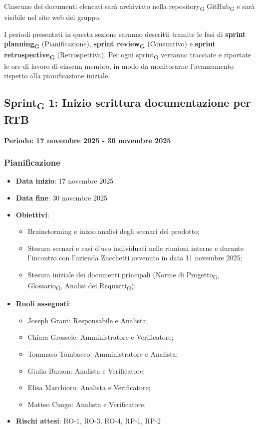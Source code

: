 \documentclass[11pt,a4paper]{article}
\newcommand{\gls}[1]{#1\textsubscript{G}}
\begin{document}
\noindent Ciascuno dei documenti elencati sarà archiviato nella \gls{repository} \gls{GitHub} e sarà visibile nel sito web del gruppo.

I periodi presentati in questa sezione saranno descritti tramite le fasi di \textbf{\gls{sprint planning}} (Pianificazione), \textbf{\gls{sprint review}} (Consuntivo) e \textbf{\gls{sprint retrospective}} (Retrospettiva). Per ogni \gls{sprint} verranno tracciate e riportate le ore di lavoro di ciascun membro, in modo da monitorarne l'avanzamento rispetto alla pianificazione iniziale.

\newpage
\subsection{\gls{Sprint} 1: Inizio scrittura documentazione per RTB}
{\textbf{Periodo: 17 novembre 2025 - 30 novembre 2025}\par}
\vspace{0.5em}

\subsubsection{Pianificazione}
\begin{itemize}
    \item \textbf{Data inizio}: 17 novembre 2025
    \item \textbf{Data fine}: 30 novembre 2025
    \item \textbf{Obiettivi}:
    \begin{itemize}
        \item Brainstorming e inizio analisi degli scenari del prodotto;
        \item Stesura scenari e casi d'uso individuati nelle riunioni interne e durante l'incontro con l'azienda Zucchetti avvenuto in data 11 novembre 2025;
        \item Stesura iniziale dei documenti principali (\gls{Norme di Progetto}, \gls{Glossario}, \gls{Analisi dei Requisiti});
    \end{itemize}
    \item \textbf{Ruoli assegnati}:
    \begin{itemize}
        \item Joseph Grant: Responsabile e Analista;
        \item Chiara Grossele: Amministratore e Verificatore;
        \item Tommaso Tombacco: Amministratore e Analista;
        \item Giulia Barzon: Analista e Verificatore;
        \item Elisa Marchioro: Analista e Verificatore;
        \item Matteo Cuogo: Analista e Verificatore.
    \end{itemize}
    \item \textbf{Rischi attesi}: RO-1, RO-3, RO-4, RP-1, RP-2
\end{itemize}
\end{document}
